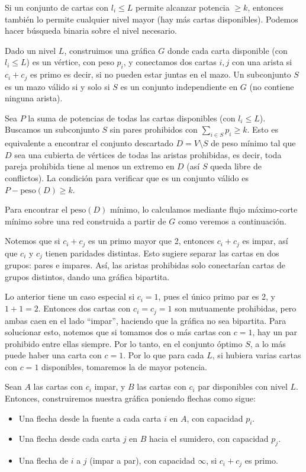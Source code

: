 Si un conjunto de cartas con $l_i \leq L$ permite alcanzar potencia $\geq k$, entonces
también lo permite cualquier nivel mayor (hay más cartas disponibles). Podemos hacer búsqueda binaria sobre el nivel necesario.

Dado un nivel $L$, construimos una gráfica $G$ donde cada carta disponible (con $l_i \leq L$) es un vértice, con peso $p_i$, y conectamos dos
cartas $i,j$ con una arista si $c_i+c_j$ es primo es decir, si no pueden estar juntas en el mazo. Un subconjunto $S$ es un mazo válido si y solo si $S$ es un conjunto independiente en $G$ (no contiene ninguna arista).

Sea $P$ la suma de potencias de todas las cartas disponibles (con $l_i \leq L$). Buscamos un subconjunto $S$ sin pares prohibidos con $\sum_{i\in S} p_i \geq k$. Esto es equivalente a encontrar el conjunto descartado $D = V\setminus S$ de peso mínimo  tal que $D$ sea una cubierta de vértices de todas las aristas prohibidas, es decir, toda pareja prohibida tiene al menos un extremo en $D$ (así $S$ queda libre de conflictos). La condición para verificar que es un conjunto válido es
$P - \text{peso}(D) \geq k$.
 
Para encontrar el $\text{peso}(D)$ mínimo, lo calculamos mediante flujo máximo-corte mínimo sobre una red construida a partir de $G$ como veremos a continuación.
 
Notemos que si $c_i+c_j$ es un primo mayor que 2, entonces $c_i+c_j$ es impar, así que $c_i$ y $c_j$ tienen paridades distintas. Esto
sugiere separar las cartas en dos grupos: pares e impares. Así, las aristas prohibidas solo conectarían cartas de grupos distintos, dando una gráfica bipartita.
 
Lo anterior tiene un caso especial si $c_i=1$, pues el único primo par es 2, y $1+1=2$. Entonces dos cartas con $c_i=c_j=1$ son
mutuamente prohibidas, pero ambas caen en el lado ``impar'', haciendo que la gráfica no sea bipartita. Para solucionar esto, notemos que si tomamos dos o más cartas con $c=1$, hay
un par prohibido entre ellas siempre. Por lo
tanto, en el conjunto óptimo $S$, a lo más puede haber una carta con $c=1$. Por lo que para cada $L$, si hubiera varias cartas con $c=1$ disponibles, tomaremos la de mayor potencia.
 
Sean $A$ las cartas con $c_i$ impar, y $B$ las cartas con $c_i$ par disponibles con nivel $L$. Entonces, construiremos nuestra gráfica poniendo flechas como sigue: 

\begin{itemize}
    \item Una flecha desde la fuente a cada carta $i$ en $A$, con capacidad $p_i$.
    \item Una flecha desde cada carta $j$ en $B$ hacia el sumidero, con capacidad $p_j$.
    \item Una flecha de $i$ a $j$ (impar a par), con capacidad $\infty$, si $c_i+c_j$ es primo.
\end{itemize}
 
